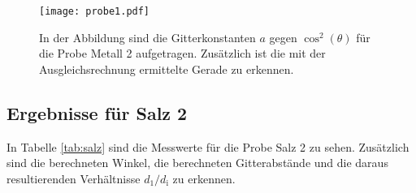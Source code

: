 \begin{figure}[H]
  \centering
  \texttt{[image: probe1.pdf]}
  \caption{In der Abbildung sind die Gitterkonstanten $a$ gegen $\cos^2(\theta)$ für die Probe Metall 2 aufgetragen. Zusätzlich ist die mit der Ausgleichsrechnung
  ermittelte Gerade zu erkennen.}
  \label{abb:metall}
\end{figure}

\subsection{Ergebnisse für Salz 2}

In Tabelle \ref{tab:salz} sind die Messwerte für die Probe Salz 2 zu sehen. Zusätzlich sind die berechneten Winkel, die berechneten Gitterabstände und die
daraus resultierenden Verhältnisse $d_1 / d_\text{i}$ zu erkennen.
